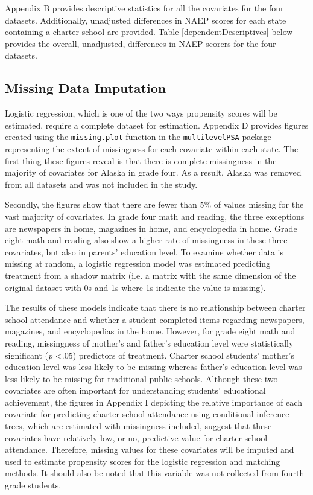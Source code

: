 \documentclass[letterpaper,12p,twoside]{article} %
\begin{document}


Appendix B provides descriptive statistics for all the covariates for the four datasets. Additionally, unadjusted differences in NAEP scores for each state containing a charter school are provided. Table \ref{dependentDescriptives} below provides the overall, unadjusted, differences in NAEP scorers for the four datasets.



\subsection{Missing Data Imputation}

Logistic regression, which is one of the two ways propensity scores will be estimated, require a complete dataset for estimation. Appendix D provides figures created using the \texttt{missing.plot} function in the \texttt{multilevelPSA} package representing the extent of missingness for each covariate within each state. The first thing these figures reveal is that there is complete missingness in the majority of covariates for Alaska in grade four. As a result, Alaska was removed from all datasets and was not included in the study. 

Secondly, the figures show that there are fewer than 5\% of values missing for the vast majority of covariates. In grade four math and reading, the three exceptions are newspapers in home, magazines in home, and encyclopedia in home. Grade eight math and reading also show a higher rate of missingness in these three covariates, but also in parents' education level. To examine whether data is missing at random, a logistic regression model was estimated predicting treatment from a shadow matrix (i.e. a matrix with the same dimension of the original dataset with 0s and 1s where 1s indicate the value is missing). 

The results of these models indicate that there is no relationship between charter school attendance and whether a student completed items regarding newspapers, magazines, and encyclopedias in the home. However, for grade eight math and reading, missingness of mother's and father's education level were statistically significant (\textit{p} \textless .05) predictors of treatment. Charter school students' mother's education level was less likely to be missing whereas father's education level was less likely to be missing for traditional public schools. Although these two covariates are often important for understanding students' educational achievement, the figures in Appendix I depicting the relative importance of each covariate for predicting charter school attendance using conditional inference trees, which are estimated with missingness included, suggest that these covariates have relatively low, or no, predictive value for charter school attendance. Therefore, missing values for these covariates will be imputed and used to estimate propensity scores for the logistic regression and matching methods. It should also be noted that this variable was not collected from fourth grade students.
\end{document}
